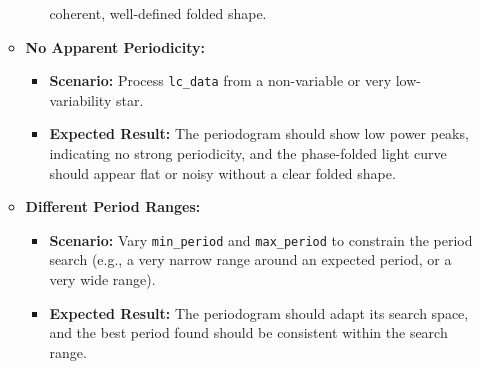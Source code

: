 \documentclass[a4paper,12pt]{article}
\DeclareRobustCommand{\bold}{\fontseries{b}\selectfont}
\newcommand{\bcode}[1]{\texttt{\fontsize{11}{13}\selectfont\bold#1}}
\newenvironment{solution}{}{}
\begin{document}
\begin{enumerate}
\begin{solution}
\begin{itemize}
\begin{itemize}
                    coherent, well-defined folded shape.
                \end{itemize}
                \item \textbf{No Apparent Periodicity:}
                \begin{itemize}
                    \item \textbf{Scenario:} Process \bcode{lc\_data} from a
                    non-variable or very low-variability star.
                    \item \textbf{Expected Result:} The periodogram should show
                    low power peaks, indicating no strong periodicity, and the
                    phase-folded light curve should appear flat or noisy without
                    a clear folded shape.
                \end{itemize}
                \item \textbf{Different Period Ranges:}
                \begin{itemize}
                    \item \textbf{Scenario:} Vary \bcode{min\_period} and
                    \bcode{max\_period} to constrain the period search (e.g., a
                    very narrow range around an expected period, or a very wide
                    range).
                    \item \textbf{Expected Result:} The periodogram should adapt
                    its search space, and the best period found should be
                    consistent within the search range.
                \end{itemize}
            \end{itemize}
        \end{solution}
    \end{enumerate}
\end{document}
